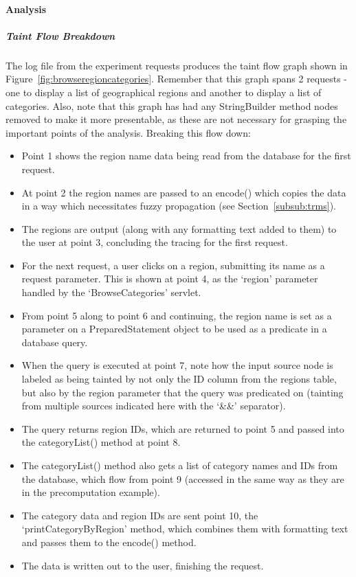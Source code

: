 \documentclass[msc,oneside]{ubcthesis}
\begin{document}
\paragraph{Analysis}
\subparagraph{Taint Flow Breakdown}
The log file from the experiment requests produces the taint flow graph shown in Figure~\ref{fig:browseregioncategories}. Remember that this graph spans 2 requests - one to display a list of geographical regions and another to display a list of categories. Also, note that this graph has had any StringBuilder method nodes removed to make it more presentable, as these are not necessary for grasping the important points of the analysis. Breaking this flow down:

\begin{itemize}
\item Point 1 shows the region name data being read from the database for the first request.
\item At point 2 the region names are passed to an encode() which copies the data in a way which necessitates fuzzy propagation (see Section~\ref{subsub:trms}).
\item The regions are output (along with any formatting text added to them) to the user at point 3, concluding the tracing for the first request.
\item For the next request, a user clicks on a region, submitting its name as a request parameter. This is shown at point 4, as the `region' parameter handled by the `BrowseCategories' servlet.
\item From point 5 along to point 6 and continuing, the region name is set as a parameter on a PreparedStatement object to be used as a predicate in a database query.
\item When the query is executed at point 7, note how the input source node is labeled as being tainted by not only the ID column from the regions table, but also by the region parameter that the query was predicated on (tainting from multiple sources indicated here with the `\&\&' separator).
\item The query returns region IDs, which are returned to point 5 and passed into the categoryList() method at point 8.
\item The categoryList() method also gets a list of category names and IDs from the database, which flow from point 9 (accessed in the same way as they are in the precomputation example).
\item The category data and region IDs are sent point 10, the `printCategoryByRegion' method, which combines them with formatting text and passes them to the encode() method.
\item The data is written out to the user, finishing the request.
\end{itemize}
\end{document}
